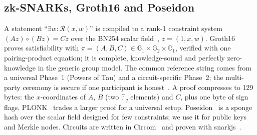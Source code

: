 \subsection{zk-SNARKs, Groth16 and Poseidon}
A statement ``$\exists w: \mathcal R(x,w)$'' is compiled to a rank-1 constraint system $(Az)\circ(Bz)=Cz$ over the BN254 scalar field~\cite{bn2005}, $z=(1,x,w)$. Groth16~\cite{groth2016} proves satisfiability with $\pi=(A,B,C)\in\mathbb G_1\times\mathbb G_2\times\mathbb G_1$, verified with one pairing-product equation; it is complete, knowledge-sound and perfectly zero-knowledge in the generic group model. The common reference string comes from a universal Phase~1 (Powers of Tau) and a circuit-specific Phase~2; the multi-party ceremony is secure if one participant is honest~\cite{bowe2017mpc}. A proof compresses to 129 bytes: the $x$-coordinates of $A$, $B$ (two $\mathbb F_q$ elements) and $C$, plus one byte of sign flags. PLONK~\cite{plonk2019} trades a larger proof for a universal setup. Poseidon~\cite{poseidon2021} is a sponge hash over the scalar field designed for few constraints; we use it for public keys and Merkle nodes. Circuits are written in Circom~\cite{circom2023} and proven with snarkjs~\cite{snarkjs}.
